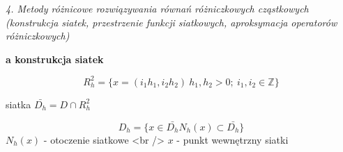 \textit{4. Metody różnicowe rozwiązywania równań różniczkowych cząstkowych (konstrukcja siatek, przestrzenie funkcji siatkowych, aproksymacja operatorów różniczkowych)}

\textbf{a\) konstrukcja siatek}

\[R^{2}_{h} = \{ x = (i_{1}h_{1}, i_{2}h_{2})\ h_{1},h_{2} > 0;\ i_{1},i_{2} \in \mathbb{Z}\}\]

siatka $\bar{D_{h}} = D \cap R^{2}_{h}$

\[D_{h} = \{ x \in \bar{D_{h}} N_h(x) \subset \bar{D_{h}}\}\]
$N_h(x)$ - otoczenie siatkowe <br />
$x$ - punkt wewnętrzny siatki